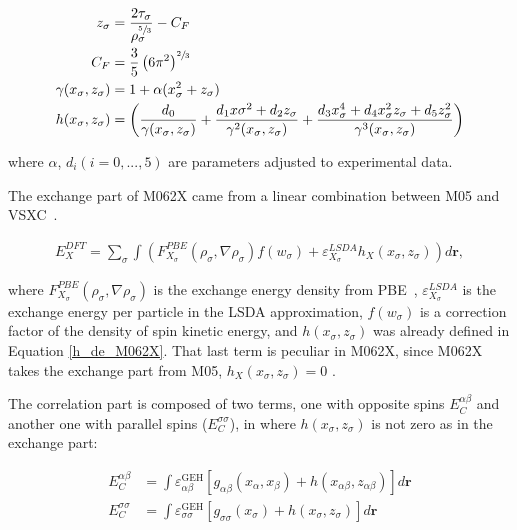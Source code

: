 \begin{align}
\begin{split}
z_\sigma &= \frac{2\tau_\sigma}{\rho_\sigma^{\sfrac53}} - C_F\\
C_F &= \frac35 \left( 6\pi^2 \right)^{\sfrac23}\\
\gamma(x_\sigma, z_\sigma ) &= 1 +\alpha (x_\sigma^2 +z_\sigma)\\
h(x_\sigma, z_\sigma ) &=
\left( \frac{d_0}{\gamma(x_\sigma, z_\sigma )} + \frac{d_1x\sigma^2 + d_2z_\sigma}{\gamma^2(x_\sigma, z_\sigma )} + \frac{d_3x_\sigma^4 + d_4x_\sigma^2z_\sigma + d_5z_\sigma^2}{\gamma^3(x_\sigma, z_\sigma )} \right) 
\label{h_de_M062X}
\end{split}
\end{align}

\noindent where $\alpha$, $d_i (i=0,...,5)$ are parameters adjusted to experimental data.

The exchange part of M062X came from a linear combination between M05 and
VSXC~\cite{Zhao2007}.

\begin{align}
E_X^{DFT} = \sum_\sigma \int
\left( F_{X_\sigma}^{PBE}(\rho_\sigma,\nabla\rho_\sigma) f(w_\sigma) + \varepsilon_{X_\sigma}^{LSDA}h_X (x_\sigma, z_\sigma) \right) d\mathbf{r},
\end{align}

\noindent where $F_{X_\sigma}^{PBE}(\rho_\sigma,\nabla\rho_\sigma)$ is the exchange
energy density from PBE~\cite{Zhao2007}, $\varepsilon_{X_\sigma}^{LSDA}$ is the
exchange energy per particle in the \gls{LSDA} approximation, $f(w_\sigma)$ is
a correction factor of the density of spin kinetic energy, and $h (x_\sigma,
z_\sigma)$ was already defined in Equation \ref{h_de_M062X}.  That last term is
peculiar in M062X, since M062X takes the exchange part from M05, $h_X
(x_\sigma, z_\sigma) = 0$ \cite{Zhao2007,Zhao2005}.

The correlation part is composed of two terms, one with opposite spins
$E_C^{\alpha\beta}$ and another one with parallel spins ($E_C^{\sigma\sigma}$),
in where $h (x_\sigma, z_\sigma)$ is not zero as in the exchange part:

\begin{align}
E_C^{\alpha\beta} &= \int\varepsilon^{\mathrm{GEH}}_{\alpha\beta}
\left[ g_{\alpha\beta} (x_\alpha, x_\beta) + h(x_{\alpha\beta},z_{\alpha\beta})\right]
d\mathbf{r}\\
E_C^{\sigma\sigma} &= \int\varepsilon^{\mathrm{GEH}}_{\sigma\sigma}
\left[ g_{\sigma\sigma} (x_\sigma) + h(x_{\sigma},z_{\sigma})\right]
d\mathbf{r}
\label{Ecalpha}
\end{align}


